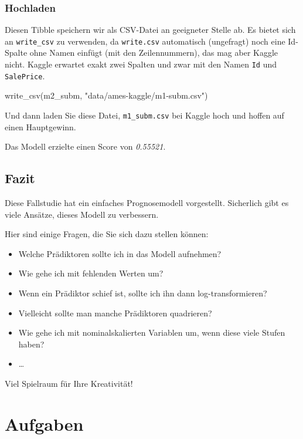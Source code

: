 \documentclass[
  letterpaper,
]{scrbook}
\newenvironment{Shaded}{\begin{snugshade}}{\end{snugshade}}
\newcommand{\FunctionTok}[1]{\textcolor[rgb]{0.28,0.35,0.67}{#1}}
\newcommand{\NormalTok}[1]{\textcolor[rgb]{0.00,0.23,0.31}{#1}}
\newcommand{\StringTok}[1]{\textcolor[rgb]{0.13,0.47,0.30}{#1}}
\providecommand{\tightlist}{%
  \setlength{\itemsep}{0pt}\setlength{\parskip}{0pt}}\usepackage{longtable,booktabs,array}
\theoremstyle{definition}
\theoremstyle{definition}
\theoremstyle{definition}
\theoremstyle{remark}
\begin{document}
\subsubsection{Hochladen}\label{hochladen}

Diesen Tibble speichern wir als CSV-Datei an geeigneter Stelle ab. Es
bietet sich an \texttt{write\_csv} zu verwenden, da \texttt{write.csv}
automatisch (ungefragt) noch eine Id-Spalte ohne Namen einfügt (mit den
Zeilennummern), das mag aber Kaggle nicht. Kaggle erwartet exakt zwei
Spalten und zwar mit den Namen \texttt{Id} und \texttt{SalePrice}.

\begin{Shaded}
\begin{Highlighting}[]
\FunctionTok{write\_csv}\NormalTok{(m2\_subm, }\StringTok{"data/ames{-}kaggle/m1{-}subm.csv"}\NormalTok{)}
\end{Highlighting}
\end{Shaded}

Und dann laden Sie diese Datei, \texttt{m1\_subm.csv} bei Kaggle hoch
und hoffen auf einen Hauptgewinn.

Das Modell erzielte einen Score von \emph{0.55521}.

\subsection{Fazit}\label{fazit-3}

Diese Fallstudie hat ein einfaches Prognosemodell vorgestellt.
Sicherlich gibt es viele Ansätze, dieses Modell zu verbessern.

Hier sind einige Fragen, die Sie sich dazu stellen können:

\begin{itemize}
\tightlist
\item
  Welche Prädiktoren sollte ich in das Modell aufnehmen?
\item
  Wie gehe ich mit fehlenden Werten um?
\item
  Wenn ein Prädiktor schief ist, sollte ich ihn dann log-transformieren?
\item
  Vielleicht sollte man manche Prädiktoren quadrieren?
\item
  Wie gehe ich mit nominalskalierten Variablen um, wenn diese viele
  Stufen haben?
\item
  \ldots{}
\end{itemize}

Viel Spielraum für Ihre Kreativität!

\section{Aufgaben}\label{aufgaben-7}
\end{document}
